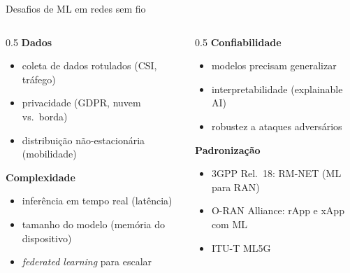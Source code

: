 \documentclass[aspectratio=169,11pt]{beamer}
\begin{document}
\begin{frame}{Desafios de ML em redes sem fio}
  \begin{columns}
    \begin{column}{0.5\textwidth}
      \textbf{Dados}
      \begin{itemize}
        \item coleta de dados rotulados (CSI, tráfego)
        \item privacidade (GDPR, nuvem vs.\ borda)
        \item distribuição não-estacionária (mobilidade)
      \end{itemize}
      \textbf{Complexidade}
      \begin{itemize}
        \item inferência em tempo real (latência)
        \item tamanho do modelo (memória do dispositivo)
        \item \emph{federated learning} para escalar
      \end{itemize}
    \end{column}
    \begin{column}{0.5\textwidth}
      \textbf{Confiabilidade}
      \begin{itemize}
        \item modelos precisam generalizar
        \item interpretabilidade (explainable AI)
        \item robustez a ataques adversários
      \end{itemize}
      \textbf{Padronização}
      \begin{itemize}
        \item 3GPP Rel.\ 18: RM-NET (ML para RAN)
        \item O-RAN Alliance: rApp e xApp com ML
        \item ITU-T ML5G
      \end{itemize}
    \end{column}
  \end{columns}
\end{frame}
\end{document}
